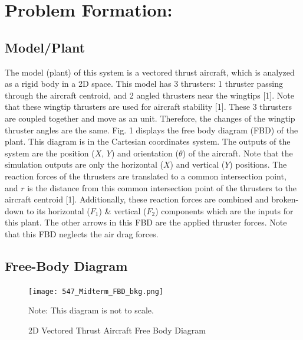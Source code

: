 \documentclass[conference]{IEEEtran}
\begin{document}
\section{Problem Formation:}
\subsection{Model/Plant}
The model (plant) of this system is a vectored thrust aircraft, which is analyzed as a rigid body in a 2D space. This model has 3 thrusters: 1 thruster passing through the aircraft centroid, and 2 angled thrusters  near the wingtips [1]. Note that these wingtip thrusters are used for aircraft stability [1]. These 3 thrusters are coupled together and move as an unit. Therefore, the changes of the wingtip thruster angles are the same. Fig. 1 displays the free body diagram  (FBD) of the plant.  This diagram is in the Cartesian coordinates system. The outputs of the system are the position ($X$, $Y$) and orientation ($\theta$) of the aircraft. Note that the simulation outputs are only the horizontal ($X$) and vertical ($Y$) positions. The reaction forces of the thrusters are translated to a common intersection point, and $r$ is the distance from this common intersection point of the thrusters to the aircraft centroid [1]. Additionally, these reaction forces are combined and broken-down to its horizontal ($F_1$) \& vertical ($F_2$) components which are the inputs for this plant. The other arrows in this FBD are the applied thruster forces. Note that this FBD neglects the air drag forces.

\subsection{Free-Body Diagram}
\begin{figure}[!htbp]
\centerline{\texttt{[image: 547\_Midterm\_FBD\_bkg.png]}}
\caption{2D Vectored Thrust Aircraft Free Body Diagram}
Note: This diagram is not to scale.
\label{figure1}
\end{figure}
\end{document}

